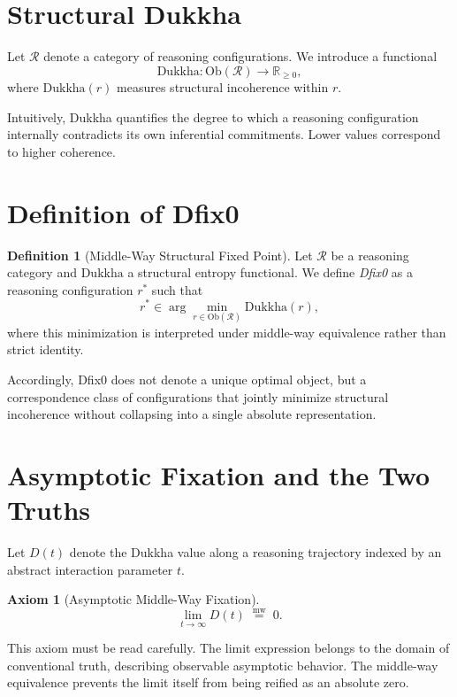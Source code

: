 \documentclass[11pt]{article}
\newcommand{\mweq}{\mathrel{\overset{\mathrm{mw}}{=}}}
\theoremstyle{definition}
\newtheorem{definition}{Definition}
\newtheorem{axiom}{Axiom}
\begin{document}
\section{Structural Dukkha}

Let $\mathcal{R}$ denote a category of reasoning configurations.
We introduce a functional
\[
\mathrm{Dukkha} : \mathrm{Ob}(\mathcal{R}) \to \mathbb{R}_{\ge 0},
\]
where $\mathrm{Dukkha}(r)$ measures structural incoherence within $r$.

Intuitively, Dukkha quantifies the degree to which a reasoning configuration
internally contradicts its own inferential commitments.
Lower values correspond to higher coherence.

\section{Definition of Dfix0}

\begin{definition}[Middle-Way Structural Fixed Point]
Let $\mathcal{R}$ be a reasoning category and
$\mathrm{Dukkha}$ a structural entropy functional.
We define \emph{Dfix0} as a reasoning configuration $r^\ast$ such that
\[
r^\ast \in \arg\min_{r \in \mathrm{Ob}(\mathcal{R})} \mathrm{Dukkha}(r),
\]
where this minimization is interpreted under middle-way equivalence
rather than strict identity.

Accordingly, Dfix0 does not denote a unique optimal object,
but a correspondence class of configurations that jointly minimize
structural incoherence without collapsing into a single absolute
representation.
\end{definition}

\section{Asymptotic Fixation and the Two Truths}

Let $D(t)$ denote the Dukkha value along a reasoning trajectory indexed
by an abstract interaction parameter $t$.

\begin{axiom}[Asymptotic Middle-Way Fixation]
\[
\lim_{t \to \infty} D(t) \;\mweq\; 0.
\]
\end{axiom}

This axiom must be read carefully.
The limit expression belongs to the domain of conventional truth,
describing observable asymptotic behavior.
The middle-way equivalence prevents the limit itself from being reified
as an absolute zero.
\end{document}
